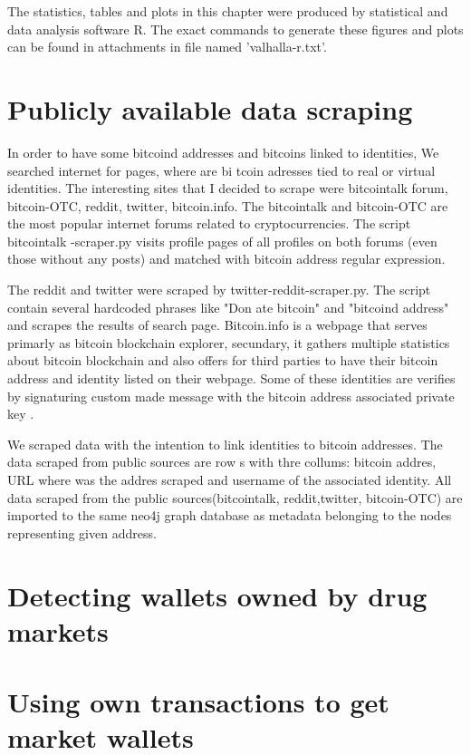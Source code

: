 \documentclass[
  digital, %
  table,   %
  lof,     %
  lot,     %
  oneside
]{fithesis3}
\begin{document}
The statistics, tables and plots in this chapter were produced by statistical and data analysis software R.
The exact commands to generate these figures and plots can be found in attachments in file named 'valhalla-r.txt'.


\section{Publicly available data scraping}
In order to have some bitcoind addresses and bitcoins linked to identities, We searched internet for pages, where are bi
tcoin adresses tied to real or virtual identities.
The interesting sites that I decided to scrape were bitcointalk forum, bitcoin-OTC, reddit, twitter, bitcoin.info.
The bitcointalk and bitcoin-OTC are the most popular internet forums related to cryptocurrencies. The script bitcointalk
-scraper.py visits profile pages of all profiles on both forums (even those without any posts)
 and matched with bitcoin address regular expression.
 
The reddit and twitter were scraped by twitter-reddit-scraper.py. The script contain several hardcoded phrases like "Don
ate bitcoin" and "bitcoind address" and scrapes the results of search page.
Bitcoin.info is a webpage that serves primarly as bitcoin blockchain explorer, secundary,
it gathers multiple statistics about bitcoin blockchain and also offers for third parties to have their bitcoin address 
and identity listed on their webpage.
Some of these identities are verifies by signaturing custom made message with the bitcoin address associated private key
.

We scraped data with the intention to link identities to bitcoin addresses. The data scraped from public sources are row
s with thre collums: bitcoin addres, URL where was the addres scraped and username of the associated identity.
All data scraped from the public sources(bitcointalk, reddit,twitter, bitcoin-OTC) are imported to the same neo4j graph 
database as metadata belonging to the nodes representing given address.

\section{Detecting wallets owned by drug markets}
\section{Using own transactions to get market wallets}
\end{document}
